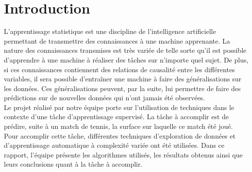 \section{Introduction}

L'apprentissage statistique est une discipline de l'intelligence artificielle permettant de transmettre des connaissances à une machine apprenante. La nature des connaissances transmises est très variée de telle sorte qu'il est possible d'apprendre à une machine à réaliser des tâches sur n'importe quel sujet. De plus, si ces connaissances contiennent des relations de causalité entre les différentes variables, il sera possible d'entraîner une machine à faire des généralisations sur les données. Ces généralisations peuvent, par la suite, lui permettre de faire des prédictions sur de nouvelles données qui n'ont jamais été observées.\\

Le projet réalisé par notre équipe porte sur l'utilisation de techniques dans le contexte d'une tâche d'apprentissage supervisé. La tâche à accomplir est de prédire, suite à un match de tennis, la surface sur laquelle ce match été joué.  Pour accomplir cette tâche, différentes techniques d'exploration de données et d'apprentissage automatique à complexité variée ont été utilisées.  Dans ce rapport, l'équipe présente les algorithmes utilisés, les résultats obtenus ainsi que leurs conclusions quant à la tâche à accomplir.

